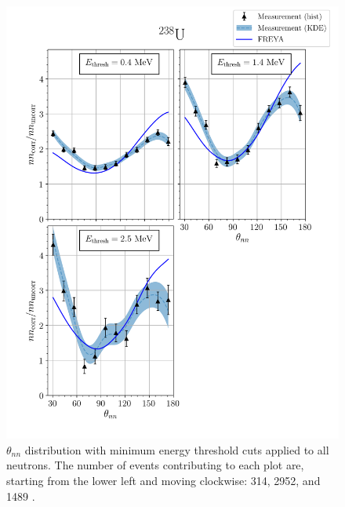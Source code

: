 \FloatBarrier
\begin{figure}
\centering
    \includegraphics[width = 1.1\textwidth]{Content/Results/FinalDUResultw_freya0KDE.png}
    \caption{$\theta_{nn}$ distribution with minimum energy threshold cuts applied to all neutrons.
    The number of events contributing to each plot are, starting from the lower left and moving clockwise: 314, 2952, and 1489 .}
    \label{fig:DU(0)}
\end{figure}
